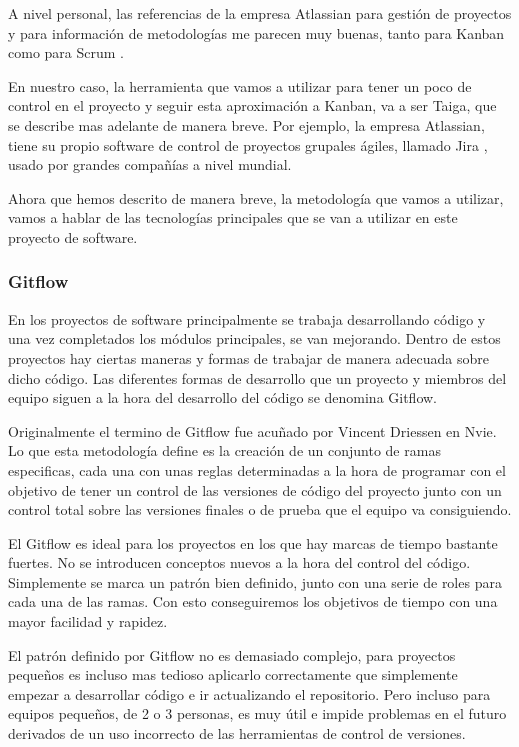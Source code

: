 A nivel personal, las referencias de la empresa Atlassian \cite{atlassian} para gestión de proyectos y para información de metodologías me parecen muy buenas, tanto para Kanban \cite{kanbanAtlassian} como para Scrum \cite{scrumAtlassian}. 

En nuestro caso, la herramienta que vamos a utilizar para tener un poco de control en el proyecto y seguir esta aproximación a Kanban, va a ser Taiga, que se describe mas adelante de manera breve. Por ejemplo, la empresa Atlassian, tiene su propio software de control de proyectos grupales ágiles, llamado Jira \cite{jiraAtlassian}, usado por grandes compañías a nivel mundial. 

Ahora que hemos descrito de manera breve, la metodología que vamos a utilizar, vamos a hablar de las tecnologías principales que se van a utilizar en este proyecto de software. 

\subsubsection{Gitflow}
 
En los proyectos de software principalmente se trabaja desarrollando código y una vez completados los módulos principales, se van mejorando. Dentro de estos proyectos hay ciertas maneras y formas de trabajar de manera adecuada sobre dicho código. Las diferentes formas de desarrollo que un proyecto y miembros del equipo siguen a la hora del desarrollo del código se denomina Gitflow. 

Originalmente el termino de Gitflow \cite{gitflow} fue acuñado por Vincent Driessen en Nvie. Lo que esta metodología define es la creación de un conjunto de ramas especificas, cada una con unas reglas determinadas a la hora de programar con el objetivo de tener un control de las versiones de código del proyecto junto con un control total sobre las versiones finales o de prueba que el equipo va consiguiendo. 

El Gitflow es ideal para los proyectos en los que hay marcas de tiempo bastante fuertes. No se introducen conceptos nuevos a la hora del control del código. Simplemente se marca un patrón bien definido, junto con una serie de roles para cada una de las ramas. Con esto conseguiremos los objetivos de tiempo con una mayor facilidad y rapidez. 

El patrón definido por Gitflow no es demasiado complejo, para proyectos pequeños es incluso mas tedioso aplicarlo correctamente que simplemente empezar a desarrollar código e ir actualizando el repositorio. Pero incluso para equipos pequeños, de 2 o 3 personas, es muy útil e impide problemas en el futuro derivados de un uso incorrecto de las herramientas de control de versiones. 

